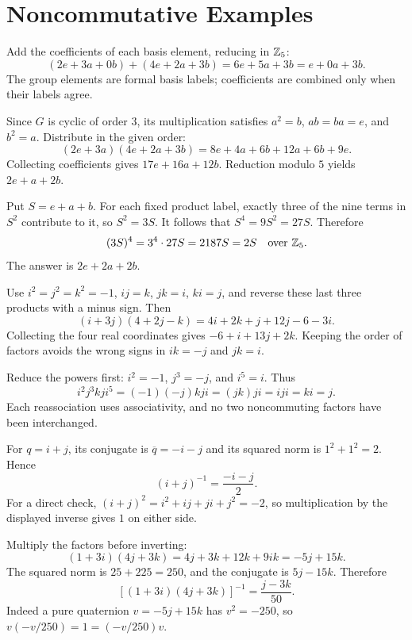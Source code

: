 \section{Noncommutative Examples}

Add the coefficients of each basis element, reducing in $\mathbb{Z}_5$:
\[(2e+3a+0b)+(4e+2a+3b)=6e+5a+3b=\boxed{e+0a+3b}.
\]
The group elements are formal basis labels; coefficients are combined only when their labels agree.

Since $G$ is cyclic of order $3$, its multiplication satisfies $a^2=b$, $ab=ba=e$, and $b^2=a$. Distribute in the given order:
\[(2e+3a)(4e+2a+3b)=8e+4a+6b+12a+6b+9e.
\]
Collecting coefficients gives $17e+16a+12b$. Reduction modulo $5$ yields $\boxed{2e+a+2b}$.

Put $S=e+a+b$. For each fixed product label, exactly three of the nine terms in $S^2$ contribute to it, so $S^2=3S$. It follows that $S^4=9S^2=27S$. Therefore
\[(3S)^4=3^4\cdot27S=2187S=2S\quad\text{over }\mathbb{Z}_5.
\]
The answer is $\boxed{2e+2a+2b}$.

Use $i^2=j^2=k^2=-1$, $ij=k$, $jk=i$, $ki=j$, and reverse these last three products with a minus sign. Then
\[(i+3j)(4+2j-k)=4i+2k+j+12j-6-3i.
\]
Collecting the four real coordinates gives $\boxed{-6+i+13j+2k}$. Keeping the order of factors avoids the wrong signs in $ik=-j$ and $jk=i$.

Reduce the powers first: $i^2=-1$, $j^3=-j$, and $i^5=i$. Thus
\[i^2j^3kji^5=(-1)(-j)kji=(jk)ji=iji=ki=\boxed j.
\]
Each reassociation uses associativity, and no two noncommuting factors have been interchanged.

For $q=i+j$, its conjugate is $\overline q=-i-j$ and its squared norm is $1^2+1^2=2$. Hence
\[\boxed{(i+j)^{-1}=\frac{-i-j}{2}}.
\]
For a direct check, $(i+j)^2=i^2+ij+ji+j^2=-2$, so multiplication by the displayed inverse gives $1$ on either side.

Multiply the factors before inverting:
\[(1+3i)(4j+3k)=4j+3k+12k+9ik=-5j+15k.
\]
The squared norm is $25+225=250$, and the conjugate is $5j-15k$. Therefore
\[\boxed{[(1+3i)(4j+3k)]^{-1}=\frac{j-3k}{50}}.
\]
Indeed a pure quaternion $v=-5j+15k$ has $v^2=-250$, so $v(-v/250)=1=(-v/250)v$.

